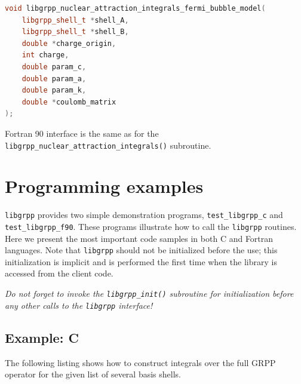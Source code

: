 \documentclass[12pt]{article}
\begin{document}
\begin{lstlisting}[language=C++]
void libgrpp_nuclear_attraction_integrals_fermi_bubble_model(
    libgrpp_shell_t *shell_A,
    libgrpp_shell_t *shell_B,
    double *charge_origin,
    int charge,
    double param_c,
    double param_a,
    double param_k,
    double *coulomb_matrix
);
\end{lstlisting}

Fortran 90 interface is the same as for the \texttt{libgrpp\_nuclear\_attraction\_integrals()} subroutine.


\section{Programming examples}

\texttt{libgrpp} provides two simple demonstration programs, \texttt{test\_libgrpp\_c} and \texttt{test\_libgrpp\_f90}. These programs illustrate how to call the \texttt{libgrpp} routines. Here we present the most important code samples in both C and Fortran languages. Note that \texttt{libgrpp} should not be initialized before the use; this initialization
is implicit and is performed the first time when the library is accessed from the client code.

\emph{\color{red}Do not forget to invoke the \texttt{libgrpp\_init()} subroutine for initialization before any other calls to the \texttt{libgrpp} interface!}

\subsection{Example: C}

The following listing shows how to construct integrals over the full GRPP operator for the given list of several basis shells.
\end{document}
